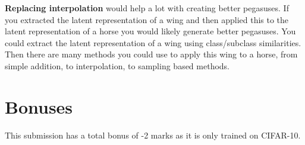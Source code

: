 \documentclass{article}
\begin{document}
\textbf{Replacing interpolation} would help a lot with creating better pegasuses. If you extracted the latent representation of a wing and then applied this to the latent representation of a horse you would likely generate better pegasuses. You could extract the latent representation of a wing using class/subclass similarities. Then there are many methods you could use to apply this wing to a horse, from simple addition, to interpolation, to sampling based methods.


\section*{Bonuses}
This submission has a total bonus of -2 marks as it is only trained on CIFAR-10.

\printbibliography
\end{document}
